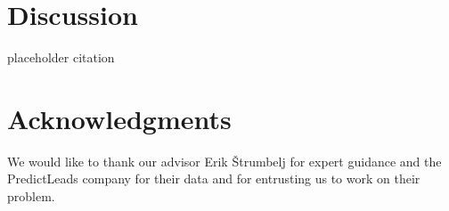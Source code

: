 \documentclass[fleqn,moreauthors,10pt]{ds_report}
\begin{document}

\section*{Discussion}

 placeholder citation \cite{Demsar2017LinguisticEvolution} 


\section*{Acknowledgments}

We would like to thank our advisor Erik Štrumbelj for expert guidance and the PredictLeads company for their data and for entrusting us to work on their problem. 




\end{document}
